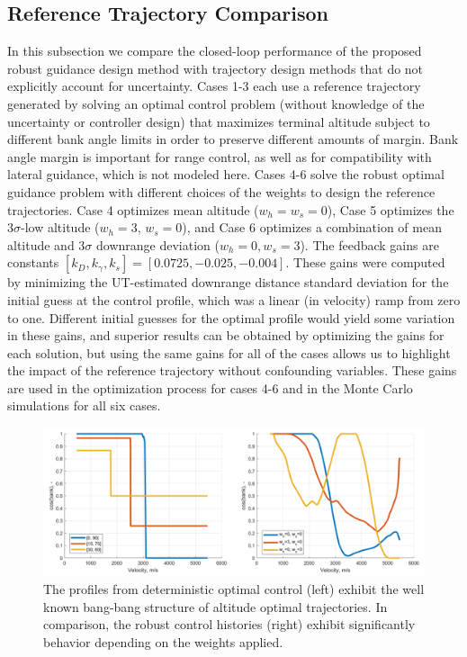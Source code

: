 \documentclass[journal ]{new-aiaa}
\begin{document}
\subsection*{Reference Trajectory Comparison}
In this subsection we compare the closed-loop performance of the proposed robust guidance design method with trajectory design methods that do not explicitly account for uncertainty. Cases 1-3 each use a reference trajectory generated by solving an optimal control problem (without knowledge of the uncertainty or controller design) that maximizes terminal altitude subject to different bank angle limits in order to preserve different amounts of margin. Bank angle margin is important for range control, as well as for compatibility with lateral guidance, which is not modeled here. 
Cases 4-6 solve the robust optimal guidance problem with different choices of the weights to design the reference trajectories. Case 4 optimizes mean altitude ($ w_h=w_s=0 $), Case 5 optimizes the 3$\sigma$-low altitude ($ w_h=3,\,w_s=0 $), and Case 6 optimizes a combination of mean altitude and 3$\sigma$ downrange deviation ($ w_h=0, w_s=3 $). The feedback gains are constants $[k_D, k_{\gamma}, k_s] = [0.0725, -0.025, -0.004]$.  These gains were computed by minimizing the UT-estimated downrange distance standard deviation for the initial guess at the control profile, which was a linear (in velocity) ramp from zero to one. Different initial guesses for the optimal profile would yield some variation in these gains, and superior results can be obtained by optimizing the gains for each solution, but using the same gains for all of the cases allows us to highlight the impact of the reference trajectory without confounding variables. These gains are used in the optimization process for cases 4-6 and in the Monte Carlo simulations for all six cases. 
\begin{figure}[h!]
	\centering
	\includegraphics[width=1\textwidth]{ddp/comparison_controls}
	\caption{The profiles from deterministic optimal control (left) exhibit the well known bang-bang structure of altitude optimal trajectories. In comparison, the robust control histories (right) exhibit significantly behavior depending on the weights applied.}
	\label{fig_control_comparison}
\end{figure}
\end{document}

